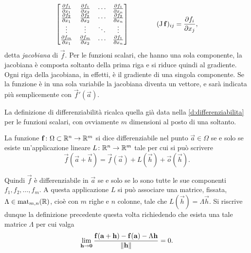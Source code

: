 \[
\begin{bmatrix}
\frac{\partial {f_1}}{\partial {x_1}}	&\frac{\partial {f_1}}{\partial {x_2}}	&\cdots	&\frac{\partial {f_1}}{\partial {x_n}}\\
\frac{\partial {f_2}}{\partial {x_1}}	&\frac{\partial {f_2}}{\partial {x_2}}	&\cdots	&\frac{\partial {f_2}}{\partial {x_n}}\\
\vdots			&\vdots			&\ddots	&\vdots\\
\frac{\partial {f_m}}{\partial {x_1}}	&\frac{\partial {f_m}}{\partial {x_2}}	&\cdots	&\frac{\partial {f_1}}{\partial {x_n}}
\end{bmatrix}\qquad\qquad(\operatorname{J}\mathbf{f})_{ij}=\frac{\partial {f_i}}{\partial {x_j}},
\]
detta \emph{jacobiana} di $\vec f$. Per le funzioni scalari, che hanno una sola componente, la jacobiana è composta soltanto della prima riga e si riduce quindi al gradiente. Ogni riga della jacobiana, in effetti, è il gradiente di una singola componente. Se la funzione è in una sola variabile la jacobiana diventa un vettore, e sarà indicata più semplicemente con $\vec f'(\vec a)$.

La definizione di differenziabilità ricalca quella già data nella \ref{d:differenziabilita} per le funzioni scalari, con ovviamente $m$ dimensioni al posto di una soltanto.
\begin{definizione}
La funzione $\mathbf{f}\colon\Omega\subset\mathbb{R}^n\to\mathbb{R}^m$ si dice differenziabile nel punto $\vec a\in\Omega$ se e solo se esiste un'applicazione lineare $L\colon\mathbb{R}^n\to\mathbb{R}^m$ tale per cui si può scrivere
\begin{equation} \label{eq:differenziabilita-app-vett}
\vec f(\vec a+\vec h)=\vec f(\vec a)+L(\vec h)+\vec o(\vec h).
\end{equation}
\end{definizione}
Quindi $\vec f$ è differenziabile in $\vec a$ se e solo se lo sono tutte le sue componenti $f_1,f_2,\dots,f_m$.
A questa applicazione $L$ %
si può associare una matrice, fissata, $\Lambda\in\operatorname{mat}_{m,n}(\mathbb{R})$, cioè con $m$ righe e $n$ colonne, tale che $L(\vec h)=\Lambda\vec h$. Si riscrive dunque la definizione precedente questa volta richiedendo che esista una tale matrice $\Lambda$ per cui valga
\begin{equation} \label{eq:differenziabilita-vett}
\lim_{\mathbf{h}\to\mathbf{0}}\frac{\mathbf{f}(\mathbf{a}+\mathbf{h})-\mathbf{f}(\mathbf{a})-\Lambda\mathbf{h}}{\left\|{\mathbf{h}}\right\|}=0.
\end{equation}

